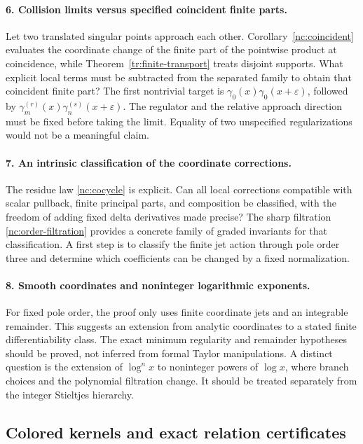 \paragraph{6. Collision limits versus specified coincident finite parts.}
Let two translated singular points approach each other.
Corollary~\ref{nc:coincident} evaluates the coordinate change of the
finite part of the pointwise product at coincidence, while
Theorem~\ref{tr:finite-transport} treats disjoint supports.
What explicit local terms must be subtracted from the separated
family to obtain that coincident finite part? The first nontrivial
target is $\gamma_0(x)\gamma_0(x+\varepsilon)$, followed by
$\gamma_m^{(r)}(x)\gamma_n^{(s)}(x+\varepsilon)$.
The regulator and the relative approach direction must be fixed
before taking the limit. Equality of two unspecified
regularizations would not be a meaningful claim.

\paragraph{7. An intrinsic classification of the coordinate corrections.}
The residue law \eqref{nc:cocycle} is explicit. Can all local
corrections compatible with scalar pullback, finite principal parts,
and composition be classified, with the freedom of adding fixed
delta derivatives made precise? The sharp filtration
\eqref{nc:order-filtration} provides a concrete family of graded
invariants for that classification. A first step is to classify
the finite jet action through pole order three and determine
which coefficients can be changed by a fixed normalization.

\paragraph{8. Smooth coordinates and noninteger logarithmic exponents.}
For fixed pole order, the proof only uses finite coordinate jets
and an integrable remainder. This suggests an extension from
analytic coordinates to a stated finite differentiability class.
The exact minimum regularity and remainder hypotheses should be
proved, not inferred from formal Taylor manipulations. A distinct
question is the extension of $\log^n x$ to noninteger powers of
$\log x$, where branch choices and the polynomial filtration change.
It should be treated separately from the integer Stieltjes hierarchy.

\subsection{Colored kernels and exact relation certificates}

